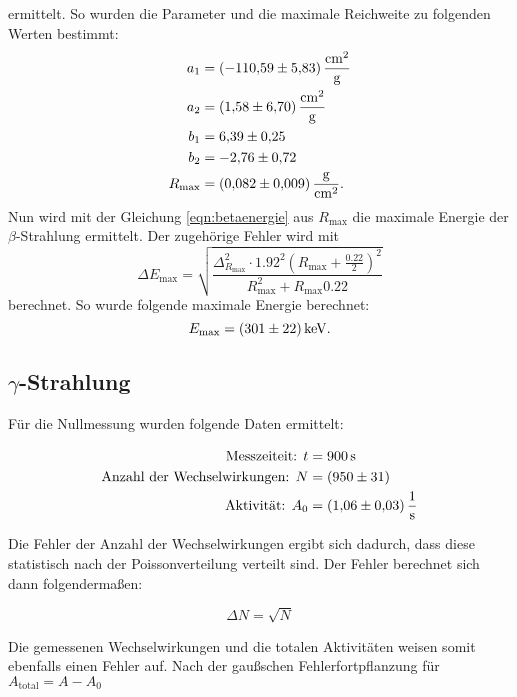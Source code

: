 ermittelt.
So wurden die Parameter und die maximale Reichweite zu folgenden Werten bestimmt:
\begin{align*}
  a_1 &= \SI{-110.59\pm5.83}{\centi\metre\squared\per\gram} \\
  a_2 &= \SI{1.58\pm6.70}{\centi\metre\squared\per\gram} \\
  b_1 &= \num{6.39\pm0.25} \\
  b_2 &= \num{-2.76\pm0.72} \\
  R_\text{max} &= \SI{0.082\pm0.009}{\gram\per\centi\metre\squared} .
\end{align*}
Nun wird mit der Gleichung \eqref{eqn:betaenergie} aus $R_\text{max}$ die maximale Energie der $\beta$-Strahlung ermittelt.
Der zugehörige Fehler wird mit
\begin{equation*}
  \Delta E_\text{max}= \sqrt{\frac{\Delta_{R_{\text{max}}}^{2} \cdot {1.92}^{2} \left(R_{\text{max}} + \frac{{0.22}}{2}\right)^{2}}{R_{\text{max}}^{2} + R_{\text{max}} {0.22}}}
\end{equation*}
berechnet.
So wurde folgende maximale Energie berechnet:
\begin{equation*}
  E_\text{max} = \SI{301\pm22}{\kilo\electronvolt}.
\end{equation*}

\subsection{\texorpdfstring{$\gamma$}{Gamma}-Strahlung}

Für die Nullmessung wurden folgende Daten ermittelt:

\begin{align*}
  \text{Messzeiteit: } t &= \SI{900}{\second} \\
  \text{Anzahl der Wechselwirkungen: } N &= (950 \pm 31) \\
  \text{Aktivität: } A_0 &= \SI{1.06 \pm 0.03}{\per\second}
\end{align*}

Die Fehler der Anzahl der Wechselwirkungen ergibt sich dadurch, dass diese statistisch nach der Poissonverteilung verteilt sind.
Der Fehler berechnet sich dann folgendermaßen:

\begin{equation}
  \Delta N = \sqrt{N}
\end{equation}

Die gemessenen Wechselwirkungen und die totalen Aktivitäten weisen somit ebenfalls einen Fehler auf.
Nach der gaußschen Fehlerfortpflanzung für $A_\text{total} = A - A_0$

